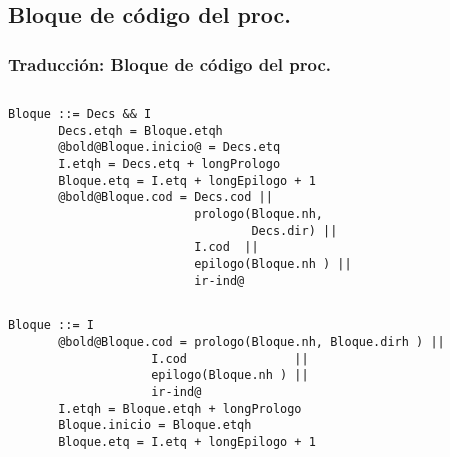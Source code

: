 \documentclass[hyperref={pdfpagelabels=false},tree-dvips,compress]{beamer}
\begin{document}
\subsection{Bloque de código del proc.}
\begin{frame}[fragile]
\frametitle{Traducción: Bloque de código del proc.}

\begin{columns}[T]
	\begin{lstlisting}[style=gramaticas,basicstyle=\scriptsize\ttfamily,mathescape]
	Bloque ::= Decs && I
	   Decs.etqh = Bloque.etqh
	   @bold@Bloque.inicio@ = Decs.etq
	   I.etqh = Decs.etq + longPrologo
	   Bloque.etq = I.etq + longEpilogo + 1
	   @bold@Bloque.cod = Decs.cod ||
	                      prologo(Bloque.nh,
	                              Decs.dir) ||
	                      I.cod  ||
	                      epilogo(Bloque.nh ) ||
	                      ir-ind@
	\end{lstlisting}


\end{columns}

	\begin{lstlisting}[style=gramaticas,basicstyle=\scriptsize\ttfamily,mathescape]
	Bloque ::= I
	   @bold@Bloque.cod = prologo(Bloque.nh, Bloque.dirh ) ||
	                I.cod               ||
	                epilogo(Bloque.nh ) ||
	                ir-ind@
	   I.etqh = Bloque.etqh + longPrologo
	   Bloque.inicio = Bloque.etqh
	   Bloque.etq = I.etq + longEpilogo + 1
	\end{lstlisting}

\end{frame}
\end{document}
